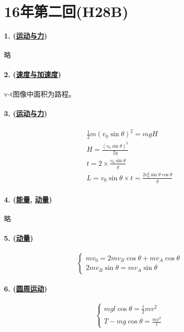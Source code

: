 
\section{16年第二回(H28B)}

\paragraph{1. (\hyperref[subsec:运动与力]{运动与力})} 略
\paragraph{2. (\hyperref[subsec:速度与加速度]{速度与加速度})} v-t图像中面积为路程。
\paragraph{3. (\hyperref[subsec:运动与力]{运动与力})}

\begin{gather*}
    \frac12m(v_0\sin\theta)^2=mgH\\
    H=\frac{(v_0\sin\theta)^2}{2g}\\
    t=2\times\frac{v_0\sin\theta}{g}\\
    L=v_0\sin\theta\times t=\frac{2v_0^2\sin\theta\cos\theta}{g}
\end{gather*}

\paragraph{4. (\hyperref[subsec:能量]{能量}, \hyperref[subsec:动量]{动量})} 略
\paragraph{5. (\hyperref[subsec:动量]{动量})}

\begin{equation*}
    \begin{cases}
        mv_0=2mv_B\cos\theta+mv_A\cos\theta\\
        2mv_B\sin\theta=mv_A\sin\theta
    \end{cases}
\end{equation*}

\paragraph{6. (\hyperref[subsec:圆周运动]{圆周运动})}

\begin{equation*}
    \begin{cases}
        mgl\cos\theta=\frac12mv^2\\
        T-mg\cos\theta=\frac{mv^2}{l}
    \end{cases}
\end{equation*}


